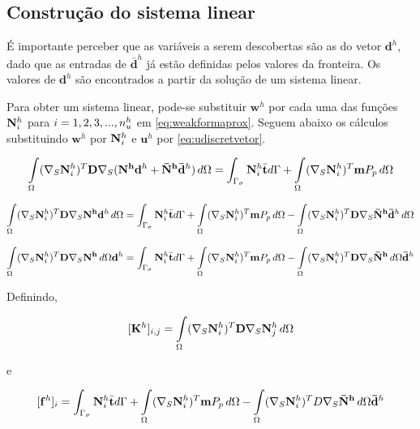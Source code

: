 \subsection{Construção do sistema linear}

É importante perceber que as variáveis a serem descobertas são as do vetor $\mathbf{d}^h$, dado que as entradas de $\mathbf{\bar{d}}^h$ já estão definidas pelos valores da fronteira. Os valores de $\mathbf{d}^h$ são encontrados a partir da solução de um sistema linear.

Para obter um sistema linear, pode-se substituir $\mathbf{w}^h$ por cada uma das funções ${\mathbf{N}_{i}^h}$ para $i = 1, 2, 3, ..., n_u^h$ em \eqref{eq:weakformaprox}. Seguem abaixo os cálculos substituindo $\mathbf{w}^h$ por ${\mathbf{N}_{i}^h}$ e $\mathbf{u}^h$ por \eqref{eq:udiscretvetor}.


\begin{equation}
\int\limits_{\Omega}  (\nabla_S {\mathbf{N}_{i}^h})^T \mathbf{D}\nabla_S (\mathbf{N^h} \mathbf{d}^h + \mathbf{\bar{N}^h} \mathbf{\bar{d}}^h ) \, d\Omega = \int_{\Gamma_\sigma} {\mathbf{N}_{i}^h} \bar{\mathbf{t}} d\Gamma + \int\limits_{\Omega} (\nabla_S {\mathbf{N}_{i}^h})^T \mathbf{m} P_p \, d\Omega
\end{equation}

\begin{equation*}
\int\limits_{\Omega}  (\nabla_S {\mathbf{N}_{i}^h})^T \mathbf{D}\nabla_S \mathbf{N^h} \mathbf{d}^h  \, d\Omega  = \int_{\Gamma_\sigma} {\mathbf{N}_{i}^h} \bar{\mathbf{t}} d\Gamma + \int\limits_{\Omega} (\nabla_S {\mathbf{N}_{i}^h})^T \mathbf{m} P_p \, d\Omega - \int\limits_{\Omega}  (\nabla_S {\mathbf{N}_{i}^h})^T \mathbf{D}\nabla_S  \mathbf{\bar{N}^h} \mathbf{\bar{d}}^h \, d\Omega
\end{equation*}

\begin{equation}\label{eq:umaequacaosistema}
\int\limits_{\Omega}  (\nabla_S {\mathbf{N}_{i}^h})^T \mathbf{D}\nabla_S \mathbf{N^h} \, d\Omega  \mathbf{d}^h   = \int_{\Gamma_\sigma} {\mathbf{N}_{i}^h} \bar{\mathbf{t}} d\Gamma + \int\limits_{\Omega} (\nabla_S {\mathbf{N}_{i}^h})^T \mathbf{m} P_p \, d\Omega - \int\limits_{\Omega}  (\nabla_S {\mathbf{N}_{i}^h})^T \mathbf{D}\nabla_S  \mathbf{\bar{N}^h}  \, d\Omega \mathbf{\bar{d}}^h
\end{equation}


Definindo,

\begin{equation}\label{eq:entradamatriz}
    [\mathbf{K}^h]_{i,j} = \int\limits_{\Omega} (\nabla_S {\mathbf{N}_{i}^h})^T \mathbf{D} \nabla_S {\mathbf{N}_{j}^h} \, d\Omega 
\end{equation}

e

\begin{equation}\label{eq:entradald}
    [\mathbf{f}^h]_i = \int_{\Gamma_\sigma} {\mathbf{N}_{i}^h} \bar{\mathbf{t}} d\Gamma + \int\limits_{\Omega} (\nabla_S {\mathbf{N}_{i}^h})^T \mathbf{m} P_p \, d\Omega - \int\limits_{\Omega}  (\nabla_S {\mathbf{N}_{i}^h})^T D \nabla_S  \mathbf{\bar{N}^h}  \, d\Omega \mathbf{\bar{d}}^h
\end{equation}



